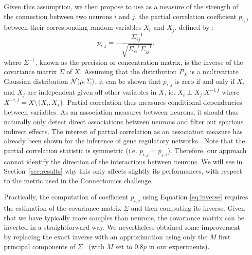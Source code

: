 \documentclass[wcp]{jmlr}
\begin{document}
Given this assumption, we then propose to use as a measure of the
strength of the connection between two neurons $i$ and $j$, the
partial correlation coefficient $p_{i,j}$ between their corresponding
random variables $X_i$ and $X_j$, defined by \cite{}:
\begin{equation}
p_{i,j} =
-\frac{\Sigma^{-1}_{ij}}{\sqrt{\Sigma^{-1}_{ii} \Sigma^{-1}_{jj}}}, \label{eq:inverse}
\end{equation}
where $\Sigma^{-1}$, known as the precision or concentration matrix, is the inverse of the covariance matrix $\Sigma$ of $X$.%
Assuming that the distribution $P_X$ is a multivariate Gaussian
distribution ${\cal N}(\mu,\Sigma)$, it can be shown that $p_{i,j}$ is
zero if and only if $X_i$ and $X_j$ are independent given all other
variables in $X$, ie. $X_i \perp X_j|X^{-i,j}$ where $X^{-i,j}= X
\setminus\{X_i,X_j\}$. Partial correlation thus measures conditional
dependencies between variables. As an association measures between
neurons, it should thus naturally only detect direct associations
between neurons and filter out spurious indirect effects. The interest
of partial correlation as an association measure has already been
shown for the inference of gene regulatory networks \cite{xxx}.
Note that the partial correlation statistic is symmetric
(i.e. $p_{i,j}=p_{j,i}$). Therefore, our approach cannot identify the
direction of the interactions between neurons. We will see in
Section~\ref{sec:results} why this only affects slightly its
performances, with respect to the metric used in the Connectomics
challenge.

Practically, the computation of coefficient $p_{i,j}$ using Equation
\ref{eq:inverse} requires the estimation of the covariance matrix $\Sigma$
and then computing its inverse. Given that we have typically more
samples than neurons, the covariance matrix can be inverted in a
straightforward way. We nevertheless obtained some improvement by
replacing the exact inverse with an approximation using only the $M$
first principal components of $\Sigma$~\citep{bishop2006pattern} (with
$M$ set to $0.8 p$ in our experiments).
\end{document}
